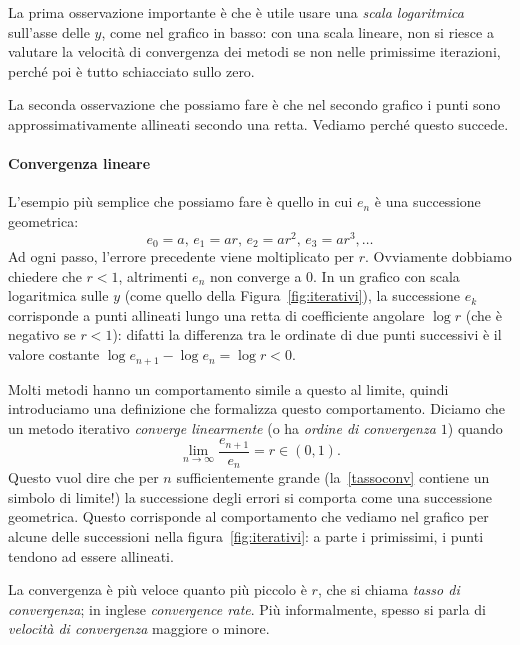 \documentclass[a4paper]{report}
\theoremstyle{definiton}
\theoremstyle{remark}
\begin{document}
La prima osservazione importante è che è utile usare una \emph{scala logaritmica} sull'asse delle $y$, come nel grafico in basso: con una scala lineare, non si riesce a valutare la velocità di convergenza dei metodi se non nelle primissime iterazioni, perché poi è tutto schiacciato sullo zero.

La seconda osservazione che possiamo fare è che nel secondo grafico i punti sono approssimativamente allineati secondo una retta. Vediamo perché questo succede.

\paragraph{Convergenza lineare} L'esempio più semplice che possiamo fare è quello in cui $e_n$ è una successione geometrica:
\[
e_0 = a,\, e_1 = ar,\, e_2 = ar^2,\, e_3 = ar^3, \dots
\]
Ad ogni passo, l'errore precedente viene moltiplicato per $r$. Ovviamente dobbiamo chiedere che $r < 1$, altrimenti $e_n$ non converge a $0$. In un grafico con scala logaritmica sulle $y$ (come quello della Figura~\ref{fig:iterativi}), la successione $e_k$ corrisponde a punti allineati lungo una retta di coefficiente angolare $\log r$ (che è negativo se $r<1$): difatti la differenza tra le ordinate di due punti successivi è il valore costante $\log e_{n+1} - \log e_n = \log r < 0$.

Molti metodi hanno un comportamento simile a questo al limite, quindi introduciamo una definizione che formalizza questo comportamento. Diciamo che un metodo iterativo \emph{converge linearmente} (o ha \emph{ordine di convergenza $1$}) quando
\begin{equation} \label{tassoconv}
    \lim_{n \to \infty }\frac{e_{n+1}}{e_n} = r \in (0,1).    
\end{equation}
Questo vuol dire che per $n$ sufficientemente grande (la~\eqref{tassoconv} contiene un simbolo di limite!) la successione degli errori si comporta come una successione geometrica. Questo corrisponde al comportamento che vediamo nel grafico per alcune delle successioni nella figura~\ref{fig:iterativi}: a parte i primissimi, i punti tendono ad essere allineati.

La convergenza è più veloce quanto più piccolo è $r$, che si chiama \emph{tasso di convergenza}; in inglese \emph{convergence rate}. Più informalmente, spesso si parla di \emph{velocità di convergenza} maggiore o minore.
\end{document}
